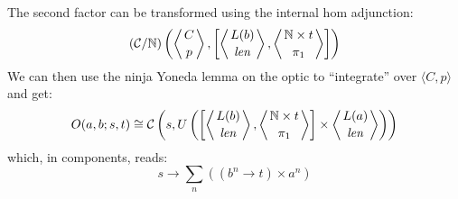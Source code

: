 \documentclass[11pt]{amsart}
\begin{document}
The second factor can be transformed using the internal hom adjunction:
\[ 
(\mathcal{C}/\mathbb{N})\left(\left \langle {C \atop p} \right \rangle, \left[ \left \langle {L(b) \atop \mathit{len}} \right \rangle, \left \langle {\mathbb{N} \times t \atop \pi_1} \right \rangle \right] \right) \]
We can then use the ninja Yoneda lemma on the optic to ``integrate'' over $\langle C, p \rangle$ and get:
\[ O(a, b; s, t) \cong \mathcal{C} \left(  s, U\left( 
  \left[ \left \langle {L(b) \atop \mathit{len}} \right \rangle, \left \langle {\mathbb{N} \times t \atop \pi_1} \right \rangle \right] \times \left \langle {L(a) \atop \mathit{len}} \right \rangle \right) \right) \]
which, in components, reads:
\[ s \to \sum_n \left( (b^n \to t) \times a^n \right) \]
\end{document}
